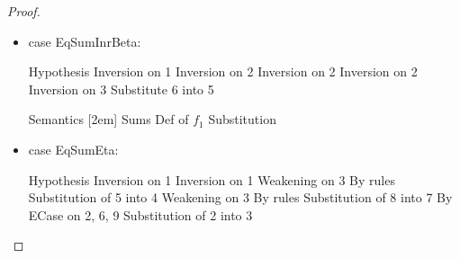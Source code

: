\begin{proof}
\begin{itemize}
\item case EqSumInrBeta:
  \begin{eqnproof}
              {Hypothesis}
              {Inversion on 1}
              {Inversion on 2}
              {Inversion on 2}
              {Inversion on 2}
              {Inversion on 3}
              {Substitute 6 into 5}
  \end{eqnproof}
  \begin{eqnproof}[\interpE{\judgeE{\Gamma}{\Case{\inr{e}}{x}{e_1}{y}{e_2}}{C}}\;\theta\;\gamma =]
          {Semantics}
           {}[2em]
          {Sums}
          {}
          {Def of $f_1$}
          {Substitution}
  \end{eqnproof}

\item case EqSumEta:
  \begin{eqnproof}
              {Hypothesis}
              {Inversion on 1}
              {Inversion on 1}
              {Weakening on 3}
              {By rules}
              {Substitution of 5 into 4}
              {Weakening on 3}
              {By rules}
              {Substitution of 8 into 7}
               {By ECase on 2, 6, 9}
               {Substitution of 2 into 3}


\end{eqnproof}
\end{itemize}
\end{proof}
